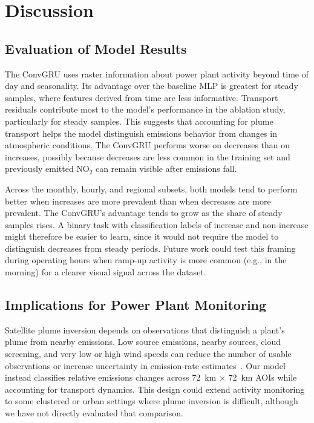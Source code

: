 \documentclass[sigconf,nonacm]{acmart}
\begin{document}
\section{Discussion}

\subsection{Evaluation of Model Results}

The ConvGRU uses raster information about power plant activity beyond time of day
and seasonality. Its advantage over the baseline MLP is greatest for steady
samples, where features derived from time are less informative. Transport residuals
contribute most to the model's performance in the ablation study, particularly
for steady samples. This suggests that accounting for plume transport helps the
model distinguish emissions behavior from changes in atmospheric conditions.
The ConvGRU performs worse on decreases than on increases, possibly because
decreases are less common in the training set and previously emitted NO$_2$ can
remain visible after emissions fall.

Across the monthly, hourly, and regional subsets, both models tend to perform
better when increases are more prevalent than when decreases are more prevalent.
The ConvGRU's advantage tends to grow as the share of steady samples rises. A
binary task with classification labels of increase and non-increase might therefore be
easier to learn, since it would not require the model to distinguish decreases
from steady periods. Future work could test this framing during operating hours
when ramp-up activity is more common (e.g., in the morning) for a clearer visual signal across the dataset.

\subsection{Implications for Power Plant Monitoring}

Satellite plume inversion depends on observations that distinguish a plant's plume from nearby emissions.
Low source emissions, nearby sources, cloud screening, and very low or high wind speeds can reduce the number
of usable observations or increase uncertainty in emission-rate estimates~\cite{huang2026detectability,kuhlmann2026temporal,santaren2025benchmarking}.
Our model instead classifies relative emissions changes across 72~km $\times$ 72~km AOIs while accounting
for transport dynamics. This design could extend activity monitoring to some clustered or urban settings
where plume inversion is difficult, although we have not directly evaluated that comparison.
\end{document}
